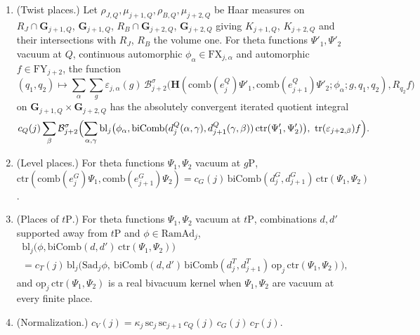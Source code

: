 \begin{hypothesis}
\begin{enumerate}[label=(L\arabic*),leftmargin=*]
\[
I^0(q_1,q_2)=\sum_\alpha\sum_g\varepsilon_{j,\alpha}(g)\,\mathcal B^\sigma_{j+2}\bigl(\mathbf H(\Phi^0_1,\Phi^0_2;\phi_\alpha;g,q_1,q_2),R_{q_2}f\bigr).
\]
Write $\mathbf G_{i,Q}$ for the points of $\mathrm U(V_i)$ at $Q$ and $K_i=K_{i,Q}K'_i$ with $K_{i,Q}$ the stabilizer of $N_i$ at $Q$ and $K'_i$ the part of $K_i$ away from $Q$. Then $I^0$ is left invariant under $R_J$ in $q_1$ and under $R_B$ in $q_2$, right invariant under $K'_{j+1}$ in $q_1$ and under $K'_{j+2}$ in $q_2$, and $I^0(q_1,q_2)\ne0$ implies $q_1\in R_J\mathbf G_{j+1,Q}K'_{j+1}$, and also $q_2\in R_B\mathbf G_{j+2,Q}K'_{j+2}$ when $q_1\in\mathbf G_{j+1,Q}$.
\item\label{w3s:L3} (Twist places.) Let $\rho_{J,Q},\mu_{j+1,Q},\rho_{B,Q},\mu_{j+2,Q}$ be Haar measures on $R_J\cap\mathbf G_{j+1,Q}$, $\mathbf G_{j+1,Q}$, $R_B\cap\mathbf G_{j+2,Q}$, $\mathbf G_{j+2,Q}$ giving $K_{j+1,Q}$, $K_{j+2,Q}$ and their intersections with $R_J$, $R_B$ the volume one. For theta functions $\Psi'_1,\Psi'_2$ vacuum at $Q$, continuous automorphic $\phi_\alpha\in\mathrm{FX}_{j,\alpha}$ and automorphic $f\in\mathrm{FY}_{j+2}$, the function
\[
(q_1,q_2)\mapsto\sum_\alpha\sum_g\varepsilon_{j,\alpha}(g)\,\mathcal B^\sigma_{j+2}\bigl(\mathbf H(\mathrm{comb}(e^Q_j)\Psi'_1,\mathrm{comb}(e^Q_{j+1})\Psi'_2;\phi_\alpha;g,q_1,q_2),R_{q_2}f\bigr)
\]
on $\mathbf G_{j+1,Q}\times\mathbf G_{j+2,Q}$ has the absolutely convergent iterated quotient integral
\[
c_Q(j)\sum_\beta\mathcal B^\sigma_{j+2}\Bigl(\sum_{\alpha,\gamma}\mathrm{bl}_j\bigl(\phi_\alpha,\mathrm{biComb}(d^Q_j(\alpha,\gamma),d^Q_{j+1}(\gamma,\beta))\,\mathrm{ctr}(\Psi'_1,\Psi'_2)\bigr),\ \mathrm{tr}(\varepsilon_{j+2,\beta})f\Bigr).
\]
\item\label{w3s:L4} (Level places.) For theta functions $\Psi_1,\Psi_2$ vacuum at $g\mathrm P$,
$\mathrm{ctr}(\mathrm{comb}(e^G_j)\Psi_1,\mathrm{comb}(e^G_{j+1})\Psi_2)=c_G(j)\,\mathrm{biComb}(d^G_j,d^G_{j+1})\,\mathrm{ctr}(\Psi_1,\Psi_2)$.
\item\label{w3s:L5} (Places of $t\mathrm P$.) For theta functions $\Psi_1,\Psi_2$ vacuum at $t\mathrm P$, combinations $d,d'$ supported away from $t\mathrm P$ and $\phi\in\mathrm{RamAd}_j$,
\begin{multline*}
\mathrm{bl}_j\bigl(\phi,\mathrm{biComb}(d,d')\,\mathrm{ctr}(\Psi_1,\Psi_2)\bigr)\\
=c_T(j)\,\mathrm{bl}_j\bigl(\mathrm{Sad}_j\phi,\ \mathrm{biComb}(d,d')\,\mathrm{biComb}(d^T_j,d^T_{j+1})\,\mathrm{op}_j\,\mathrm{ctr}(\Psi_1,\Psi_2)\bigr),
\end{multline*}
and $\mathrm{op}_j\,\mathrm{ctr}(\Psi_1,\Psi_2)$ is a real bivacuum kernel when $\Psi_1,\Psi_2$ are vacuum at every finite place.
\item\label{w3s:L6} (Normalization.) $c_V(j)=\kappa_j\,\mathrm{sc}_j\,\mathrm{sc}_{j+1}\,c_Q(j)\,c_G(j)\,c_T(j)$.
\end{enumerate}
\end{hypothesis}

